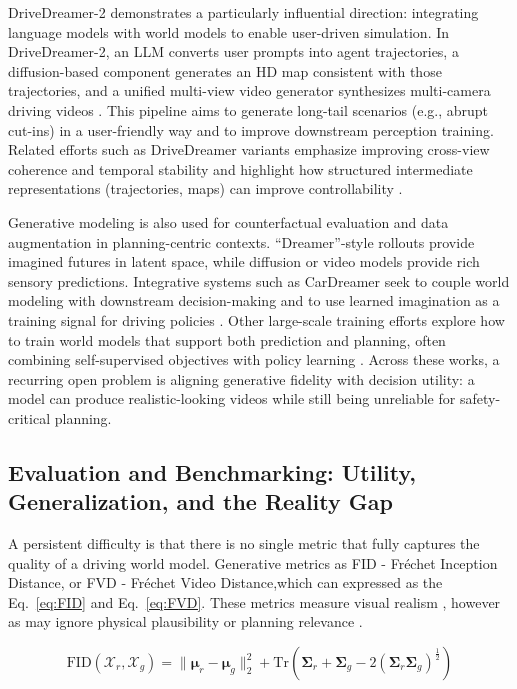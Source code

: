 DriveDreamer-2 demonstrates a particularly influential direction: integrating language models with world models to enable user-driven simulation. In DriveDreamer-2, an LLM converts user prompts into agent trajectories, a diffusion-based component generates an HD map consistent with those trajectories, and a unified multi-view video generator synthesizes multi-camera driving videos \cite{Zhao2024}. This pipeline aims to generate long-tail scenarios (e.g., abrupt cut-ins) in a user-friendly way and to improve downstream perception training. Related efforts such as DriveDreamer variants emphasize improving cross-view coherence and temporal stability and highlight how structured intermediate representations (trajectories, maps) can improve controllability \cite{WangDriveDreamer2023}.

Generative modeling is also used for counterfactual evaluation and data augmentation in planning-centric contexts. “Dreamer”-style rollouts provide imagined futures in latent space, while diffusion or video models provide rich sensory predictions. Integrative systems such as CarDreamer seek to couple world modeling with downstream decision-making and to use learned imagination as a training signal for driving policies \cite{Gao2024}. Other large-scale training efforts explore how to train world models that support both prediction and planning, often combining self-supervised objectives with policy learning \cite{Assran2025,Wu2025}. Across these works, a recurring open problem is aligning generative fidelity with decision utility: a model can produce realistic-looking videos while still being unreliable for safety-critical planning.

\subsection{Evaluation and Benchmarking: Utility, Generalization, and the Reality Gap}

A persistent difficulty is that there is no single metric that fully captures the quality of a driving world model. Generative metrics as FID - Fréchet Inception Distance, or FVD - Fréchet Video Distance,which can expressed as the Eq.~\eqref{eq:FID} and Eq.~\eqref{eq:FVD}. These metrics measure visual realism , however as  may ignore physical plausibility or planning relevance \cite{Baraldi2025}.

\begin{equation}
\label{eq:FID}
\mathrm{FID}(\mathcal{X}_r, \mathcal{X}_g)
=
\|\boldsymbol{\mu}_r - \boldsymbol{\mu}_g\|_2^2
+
\mathrm{Tr}
\left(
\boldsymbol{\Sigma}_r
+
\boldsymbol{\Sigma}_g
-
2\left(
\boldsymbol{\Sigma}_r \boldsymbol{\Sigma}_g
\right)^{\frac{1}{2}}
\right)
\end{equation}

